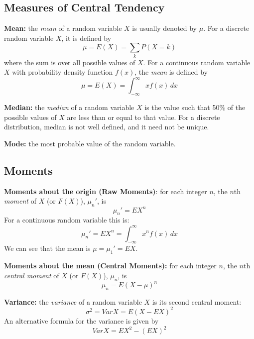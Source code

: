 \subsection{Measures of Central Tendency}

\begin{definition}
	\textbf{Mean:} the \textit{mean} of a random variable $X$ is usually denoted by $\mu$. For a discrete random variable $X$, it is defined by
	\[
		\mu = E(X) = \sum_{k}P(X = k)
	\]
	where the sum is over all possible values of $X$. For a continuous random variable $X$ with probability density function $f(x)$, the \textit{mean} is defined by
	\[
		\mu = E(X) = \int_{-\infty}^{\infty} xf(x) \, dx
	\]
\end{definition}

\begin{definition}
	\textbf{Median:} the \textit{median} of a random variable $X$ is the value such that 50\% of the possible values of $X$ are less than or equal to that value. For a discrete distribution, median is not well defined, and it need not be unique.
\end{definition}

\begin{definition}
	\textbf{Mode:} the most probable value of the random variable.
\end{definition}

\subsection{Moments}

\begin{definition}
	\textbf{Moments about the origin (Raw Moments)}: for each integer $n$, the $n$th \textit{moment} of $X$ (or $F(X)$), $\mu_n'$, is
	\[
		\mu_n' = EX^n
	\]
	For a continuous random variable this is:
	\[
		\mu_n' = EX^n = \int_{-\infty}^{\infty} x^n f(x) \, dx
	\]
	We can see that the mean is $\mu = \mu_1' = EX$.
\end{definition}

\begin{definition}
	\textbf{Moments about the mean (Central Moments):} for each integer $n$, the $n$th \textit{central moment} of $X$ (or $F(X)$), $\mu_n$, is
	\[
		\mu_n = E(X - \mu)^n
	\]
\end{definition}

\begin{definition}
	\textbf{Variance:} the \textit{variance} of a random variable $X$ is its second central moment:
	\[
		\sigma^2 = VarX = E(X - EX)^2
	\]
	An alternative formula for the variance is given by
	\[
		VarX = EX^2 - (EX)^2
	\]
\end{definition}

